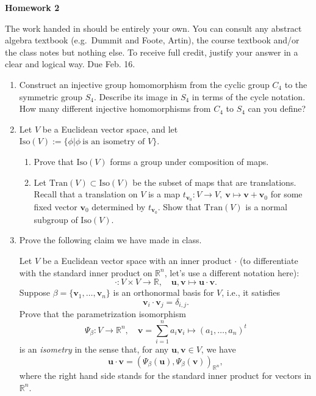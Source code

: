 \documentclass[12pt]{article}
\title{}
\date{}
\theoremstyle{plain}
\theoremstyle{definition}
\theoremstyle{remark}
\newcommand{\R}{\mathbb{R}}
\newcommand{\lra}{\longrightarrow}
\begin{document}
\begin{center}
{\Large \bf Homework 2}
\end{center}
The work handed in should be entirely your own. You can consult any abstract algebra textbook (e.g.~Dummit and Foote, Artin), the course textbook and/or the class notes but nothing else. To receive full credit, justify your answer in a clear and logical way. Due Feb. 16.

\begin{enumerate}

\item Construct an injective group homomorphism from the cyclic group $C_4$ to the symmetric group $S_4$. 
Describe its image in $S_4$ in  terms of the cycle notation. How many different injective homomorphisms 
from $C_4$ to $S_4$ can you define? 

\item Let $V$ be a Euclidean vector space, and let $\mathrm{Iso}(V):=\{\phi|\phi~\textrm{is an isometry of $V$}\}$. 
\begin{enumerate}
\item Prove that $\mathrm{Iso}(V)$ forms a group under composition of maps.
\item Let $\mathrm{Tran}(V)\subset \mathrm{Iso}(V)$ be the subset of maps that are translations. Recall that a translation on $V$ is a map $t_{\mathbf{v}_0}: V\lra V,~\mathbf{v}\mapsto \mathbf{v}+\mathbf{v}_0$ for some fixed vector $\mathbf{v}_0$ determined by $t_{\mathbf{v}_0}$. Show that $\mathrm{Tran}(V)$ is a normal subgroup of $\mathrm{Iso}(V)$.
\end{enumerate}

\item Prove the following claim we have made in class. 

Let $V$ be a Euclidean vector space with an inner product $\cdot$ (to differentiate with the standard inner product on $\R^n$, let's use a different notation here):
\[
\cdot: V\times V\lra \R, \quad \mathbf{u}, \mathbf{v}\mapsto \mathbf{u}\cdot \mathbf{v}.
\]
Suppose $\beta=\{\mathbf{v}_1,\dots, \mathbf{v}_n\}$ is an orthonormal basis for $V$, i.e., it satisfies
\[
\mathbf{v}_i\cdot \mathbf{v}_j=\delta_{i,j}.
\]
Prove that the parametrization isomorphism
\[
\Psi_{\beta}: V\lra \R^n, \quad \mathbf{v}=\sum_{i=1}^n a_i\mathbf{v}_i\mapsto (a_1,\dots, a_n)^t
\]
is an \emph{isometry} in the sense that, for any $\mathbf{u}, \mathbf{v} \in V$, we have
\[
\mathbf{u}\cdot \mathbf{v} = (\Psi_\beta(\mathbf{u}), \Psi_\beta(\mathbf{v}))_{\R^n},
\] 
where the right hand side stands for the standard inner product for vectors in $\R^n$.



\end{enumerate}
\end{document}
